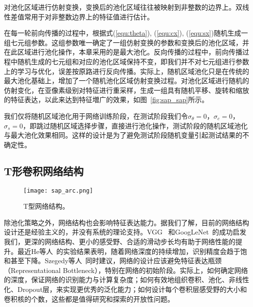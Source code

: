 对池化区域进行仿射变换，变换后的池化区域往往被映射到非整数的边界上。双线性差值常用于对非整数边界上的特征值进行估计。

在每一轮前向传播的过程中，根据式(\ref{equ:theta}), (\ref{equ:cx}), (\ref{equ:sx})随机生成一组七元组参数。这组参数唯一确定了一组仿射变换的参数和变换后的池化区域，并在此区域进行池化操作，本章采用的是最大池化。反向传播的过程中，前向传播过程中随机生成的七元组和对应的池化区域保持不变，即我们并不对七元组进行参数上的学习与优化，误差按原路进行反向传播。实际上，随机区域池化只是在传统的最大池化基础上，增加了一个随机池化区域仿射变换过程。对池化区域进行随机的仿射变化，在亚像素级别对特征进行重采样，生成一组具有随机平移、旋转和缩放的特征表达，以此来达到特征増广的效果，如图~\ref{fig:sap_sap}所示。

我们仅将随机区域池化用于网络训练阶段，在测试阶段我们令${\sigma_{\theta}=0}$，${\sigma_c=0}$， ${\sigma_s=0}$，即跳过随机区域选择步骤，直接进行池化操作，测试阶段的随机区域池化与最大池化效果相同。这样的设计是为了避免测试阶段随机变量引起测试结果的不确定性。


\subsection{T形卷积网络结构}
\label{sec:sap:model:t}

\begin{figure} [t]
\centering
\texttt{[image: sap\_arc.png]}
\caption{T型网络结构。}
\label{fig:sap_arc}
\end{figure}

除池化策略之外，网络结构也会影响特征表达能力。据我们了解，目前的网络结构设计还是经验主义的，并没有系统的理论支持。VGG~\cite{simonyan2014very} 和GoogLeNet~\cite{szegedy2014going,szegedy2015rethinking,szegedy2016inception}的成功启发我们，更深的网络结构、更小的感受野、合适的滑动步长均有助于网络性能的提升。最近He等人~\cite{he2015deep}的实验结果表明，随着网络深度的持续增加，识别精度会趋于饱和甚至下降。Szegedy等人~\cite{szegedy2015rethinking}同时建议，网络的设计应该避免特征表达瓶颈（Representational Bottleneck），特别在网络的初始阶段。实际上，如何确定网络的深度，保证网络的识别能力与计算复杂度；如何有效地组织卷积、池化、非线性化、Dropout层，来实现更优秀的泛化能力；如何设计每个卷积层感受野的大小和卷积核的个数，这些都是值得研究和探索的开放性问题。

